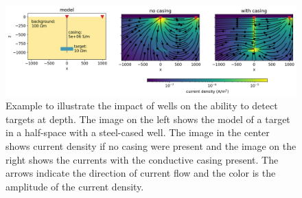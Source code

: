 \begin{figure}[!htb]
    \begin{center}
    \includegraphics[width=1\textwidth]{figures/impact-of-wells.png}
    \end{center}
\caption{
    Example to illustrate the impact of wells on the ability to detect targets at depth. The image on the left shows the model of a target in a half-space with a steel-cased well. The image in the center shows current density if no casing were present and the image on the right shows the currents with the conductive casing present. The arrows indicate the direction of current flow and the color is the amplitude of the current density.
}
\label{fig:impact-of-wells}
\end{figure}

